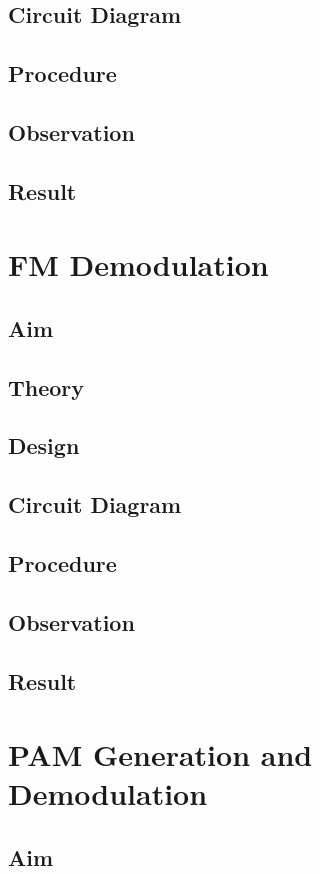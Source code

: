 \documentclass{book}
\begin{document}
\section*{Circuit Diagram}
\section*{Procedure}
\section*{Observation}
\section*{Result}
\chapter[FM Demodulation]{FM Demodulation}
\section*{Aim}
\section*{Theory}
\section*{Design}
\section*{Circuit Diagram}
\section*{Procedure}
\section*{Observation}
\section*{Result}

\chapter[PAM Generation and Demodulation]{PAM Generation and Demodulation}
\section*{Aim}
\end{document}
